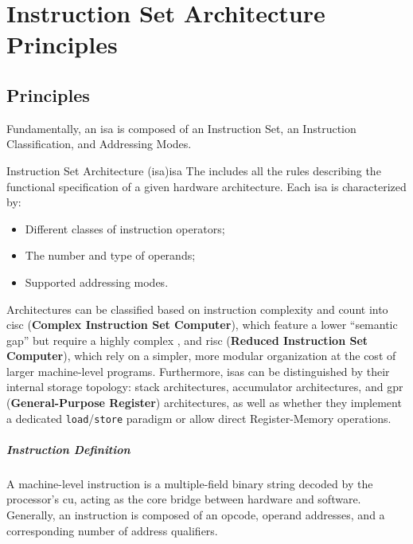 \chapter{Instruction Set Architecture Principles}

\section{ Principles}
Fundamentally, an \gls{isa} is composed of an Instruction Set, an Instruction Classification, and Addressing Modes.

\begin{definition}{Instruction Set Architecture (\gls*{isa})}{isa}
    The  includes all the rules describing the functional specification of a given hardware architecture. Each \gls{isa} is characterized by:
    \begin{itemize}
        \item Different classes of instruction operators;
        \item The number and type of operands;
        \item Supported addressing modes.
    \end{itemize}
\end{definition}

\noindent Architectures can be classified based on instruction complexity and count into \gls{cisc} (\textbf{Complex Instruction Set Computer}), which feature a lower ``semantic gap'' but require a highly complex , and \gls{risc} (\textbf{Reduced Instruction Set Computer}), which rely on a simpler, more modular organization at the cost of larger machine-level programs. Furthermore, \glspl{isa} can be distinguished by their internal storage topology: stack architectures, accumulator architectures, and \gls{gpr} (\textbf{General-Purpose Register}) architectures, as well as whether they implement a dedicated \texttt{load}/\texttt{store} paradigm or allow direct Register-Memory operations.

\paragraph{Instruction Definition} A machine-level instruction is a multiple-field binary string decoded by the processor's \gls{cu}, acting as the core bridge between hardware and software. Generally, an instruction is composed of an opcode, operand addresses, and a corresponding number of address qualifiers.

